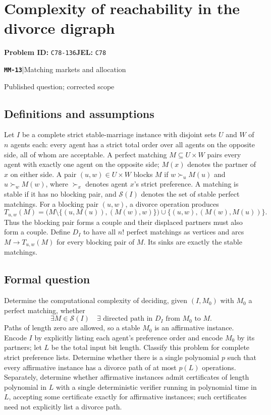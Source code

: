 \documentclass[11pt,a4paper]{article}
\newcommand{\entrymeta}[3]{{\sffamily\small\color{muted}\textbf{\texttt{#1}}\quad|\quad #2\par #3\par}}
\begin{document}
\section*{Complexity of reachability in the divorce digraph}
\textbf{Problem ID:} \texttt{C78-136}\quad \textbf{JEL:} \texttt{C78}\par
\label{problem:OP-0554}
\label{beyond:MM-13}
\entrymeta{MM-13}{Matching markets and allocation}{Published question; corrected scope}
\subsection*{Definitions and assumptions}
Let $I$ be a complete strict stable-marriage instance with disjoint sets $U$ and $W$ of $n$ agents each: every agent has a strict total order over all agents on the opposite side, all of whom are acceptable. A perfect matching $M\subseteq U\times W$ pairs every agent with exactly one agent on the opposite side; $M(x)$ denotes the partner of $x$ on either side. A pair $(u,w)\in U\times W$ blocks $M$ if $w\succ_u M(u)$ and $u\succ_w M(w)$, where $\succ_x$ denotes agent $x$'s strict preference. A matching is stable if it has no blocking pair, and $\mathcal S(I)$ denotes the set of stable perfect matchings. For a blocking pair $(u,w)$, a divorce operation produces
\[
 T_{u,w}(M)=
 \bigl(M\setminus\{(u,M(u)),(M(w),w)\}\bigr)
 \cup\{(u,w),(M(w),M(u))\}.
\]
Thus the blocking pair forms a couple and their displaced partners must also form a couple. Define $D_I$ to have all $n!$ perfect matchings as vertices and arcs $M\to T_{u,w}(M)$ for every blocking pair of $M$. Its sinks are exactly the stable matchings.
\subsection*{Formal question}
Determine the computational complexity of deciding, given $(I,M_0)$ with $M_0$ a perfect matching, whether
\[
 \exists M\in\mathcal S(I)\quad\exists\text{ directed path in }D_I
 \text{ from }M_0\text{ to }M.
\]
Paths of length zero are allowed, so a stable $M_0$ is an affirmative instance. Encode $I$ by explicitly listing each agent's preference order and encode $M_0$ by its partners; let $L$ be the total input bit length. Classify this problem for complete strict preference lists. Determine whether there is a single polynomial $p$ such that every affirmative instance has a divorce path of at most $p(L)$ operations. Separately, determine whether affirmative instances admit certificates of length polynomial in $L$ with a single deterministic verifier running in polynomial time in $L$, accepting some certificate exactly for affirmative instances; such certificates need not explicitly list a divorce path.
\end{document}
